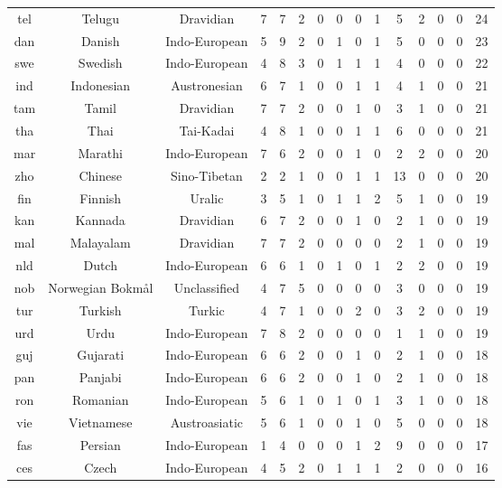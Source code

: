 \begin{longtable}{ccc|ccccccccccc|c}
    tel & Telugu & Dravidian & 7 & 7 & 2 & 0 & 0 & 0 & 1 & 5 & 2 & 0 & 0 & 24 \\ 
    dan & Danish & Indo-European & 5 & 9 & 2 & 0 & 1 & 0 & 1 & 5 & 0 & 0 & 0 & 23 \\ 
    swe & Swedish & Indo-European & 4 & 8 & 3 & 0 & 1 & 1 & 1 & 4 & 0 & 0 & 0 & 22 \\ 
    ind & Indonesian & Austronesian & 6 & 7 & 1 & 0 & 0 & 1 & 1 & 4 & 1 & 0 & 0 & 21 \\ 
    tam & Tamil & Dravidian & 7 & 7 & 2 & 0 & 0 & 1 & 0 & 3 & 1 & 0 & 0 & 21 \\ 
    tha & Thai & Tai-Kadai & 4 & 8 & 1 & 0 & 0 & 1 & 1 & 6 & 0 & 0 & 0 & 21 \\ 
    mar & Marathi & Indo-European & 7 & 6 & 2 & 0 & 0 & 1 & 0 & 2 & 2 & 0 & 0 & 20 \\ 
    zho & Chinese & Sino-Tibetan & 2 & 2 & 1 & 0 & 0 & 1 & 1 & 13 & 0 & 0 & 0 & 20 \\ 
    fin & Finnish & Uralic & 3 & 5 & 1 & 0 & 1 & 1 & 2 & 5 & 1 & 0 & 0 & 19 \\ 
    kan & Kannada & Dravidian & 6 & 7 & 2 & 0 & 0 & 1 & 0 & 2 & 1 & 0 & 0 & 19 \\ 
    mal & Malayalam & Dravidian & 7 & 7 & 2 & 0 & 0 & 0 & 0 & 2 & 1 & 0 & 0 & 19 \\ 
    nld & Dutch & Indo-European & 6 & 6 & 1 & 0 & 1 & 0 & 1 & 2 & 2 & 0 & 0 & 19 \\ 
    nob & Norwegian Bokmål & Unclassified & 4 & 7 & 5 & 0 & 0 & 0 & 0 & 3 & 0 & 0 & 0 & 19 \\ 
    tur & Turkish & Turkic & 4 & 7 & 1 & 0 & 0 & 2 & 0 & 3 & 2 & 0 & 0 & 19 \\ 
    urd & Urdu & Indo-European & 7 & 8 & 2 & 0 & 0 & 0 & 0 & 1 & 1 & 0 & 0 & 19 \\ 
    guj & Gujarati & Indo-European & 6 & 6 & 2 & 0 & 0 & 1 & 0 & 2 & 1 & 0 & 0 & 18 \\ 
    pan & Panjabi & Indo-European & 6 & 6 & 2 & 0 & 0 & 1 & 0 & 2 & 1 & 0 & 0 & 18 \\ 
    ron & Romanian & Indo-European & 5 & 6 & 1 & 0 & 1 & 0 & 1 & 3 & 1 & 0 & 0 & 18 \\ 
    vie & Vietnamese & Austroasiatic & 5 & 6 & 1 & 0 & 0 & 1 & 0 & 5 & 0 & 0 & 0 & 18 \\ 
    fas & Persian & Indo-European & 1 & 4 & 0 & 0 & 0 & 1 & 2 & 9 & 0 & 0 & 0 & 17 \\ 
    ces & Czech & Indo-European & 4 & 5 & 2 & 0 & 1 & 1 & 1 & 2 & 0 & 0 & 0 & 16 \\ 

\end{longtable}
